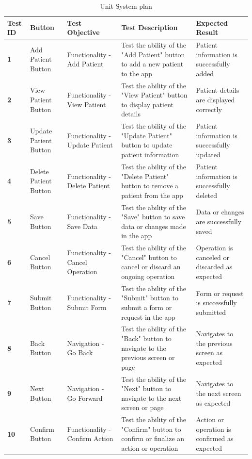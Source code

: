 \documentclass[12pt]{article}
\begin{document}
		\newpage
			\begin{table}[!h]
			\centering
			\caption{Unit System plan}
			\begin{tabular}{|p{1cm}|p{2cm}|p{2.3cm}|p{6cm}|p{3cm}|}
				\hline
				\rowcolor{lightgray}
				\textbf{Test ID} & \textbf{Button} &\textbf{Test Objective} & \textbf{Test Description} & \textbf{Expected Result} \\
				\hline
				\cellcolor{lightgray}\textbf{1} & Add Patient Button & Functionality - Add Patient &  Test the ability of the "Add Patient" button to add a new patient to the app & Patient information is successfully added  \\
				\hline
				\cellcolor{lightgray}\textbf{2} & View Patient Button & Functionality - View Patient & Test the ability of the "View Patient" button to display patient details & Patient details are displayed correctly\\
				\hline
				\cellcolor{lightgray}\textbf{3} & Update Patient Button & Functionality - Update Patient & Test the ability of the "Update Patient" button to update patient information & Patient information is successfully updated \\
				\hline
				\cellcolor{lightgray}\textbf{4} & Delete Patient Button & Functionality - Delete Patient & Test the ability of the "Delete Patient" button to remove a patient from the app & Patient information is successfully deleted \\
				\hline
				\cellcolor{lightgray}\textbf{5} & Save Button & Functionality - Save Data & Test the ability of the "Save" button to save data or changes made in the app & Data or changes are successfully saved \\
				\hline
				\cellcolor{lightgray}\textbf{6} & Cancel Button & Functionality - Cancel Operation & Test the ability of the "Cancel" button to cancel or discard an ongoing operation & Operation is canceled or discarded as expected\\
				\hline
				\cellcolor{lightgray}\textbf{7} & Submit Button & Functionality - Submit Form & Test the ability of the "Submit" button to submit a form or request in the app & Form or request is successfully submitted\\
				\hline
				\cellcolor{lightgray}\textbf{8} & Back Button & Navigation - Go Back & Test the ability of the "Back" button to navigate to the previous screen or page & Navigates to the previous screen as expected\\
				\hline
				\cellcolor{lightgray}\textbf{9} & Next Button & Navigation - Go Forward & Test the ability of the "Next" button to navigate to the next screen or page & Navigates to the next screen as expected\\
				\hline
				\cellcolor{lightgray}\textbf{10} & Confirm Button & Functionality - Confirm Action & Test the ability of the "Confirm" button to confirm or finalize an action or operation & Action or operation is confirmed as expected \\
				\hline
			\end{tabular}
		\end{table}
		\newpage
\end{document}

